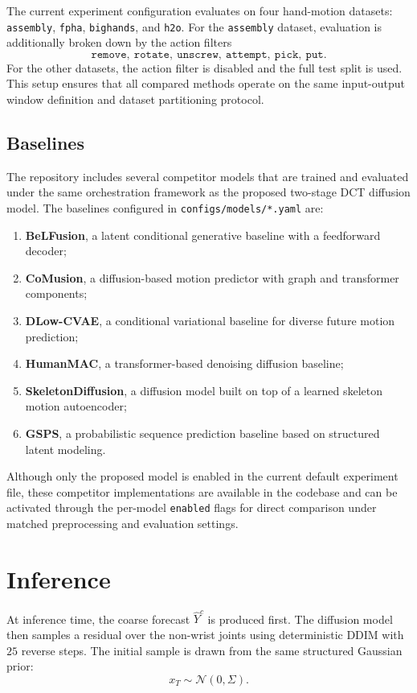 \documentclass[11pt]{article}
\begin{document}
The current experiment configuration evaluates on four hand-motion datasets:
\texttt{assembly}, \texttt{fpha}, \texttt{bighands}, and \texttt{h2o}. For
the \texttt{assembly} dataset, evaluation is additionally broken down by the
action filters
\[
\texttt{remove},\ \texttt{rotate},\ \texttt{unscrew},\ \texttt{attempt},\ \texttt{pick},\ \texttt{put}.
\]
For the other datasets, the action filter is disabled and the full test split
is used. This setup ensures that all compared methods operate on the same
input-output window definition and dataset partitioning protocol.

\subsection{Baselines}

The repository includes several competitor models that are trained and
evaluated under the same orchestration framework as the proposed two-stage DCT
diffusion model. The baselines configured in
\texttt{configs/models/*.yaml} are:
\begin{enumerate}
\item \textbf{BeLFusion}, a latent conditional generative baseline with a
feedforward decoder;
\item \textbf{CoMusion}, a diffusion-based motion predictor with graph and
transformer components;
\item \textbf{DLow-CVAE}, a conditional variational baseline for diverse
future motion prediction;
\item \textbf{HumanMAC}, a transformer-based denoising diffusion baseline;
\item \textbf{SkeletonDiffusion}, a diffusion model built on top of a learned
skeleton motion autoencoder;
\item \textbf{GSPS}, a probabilistic sequence prediction baseline based on
structured latent modeling.
\end{enumerate}

Although only the proposed model is enabled in the current default experiment
file, these competitor implementations are available in the codebase and can
be activated through the per-model \texttt{enabled} flags for direct
comparison under matched preprocessing and evaluation settings.

\section{Inference}

At inference time, the coarse forecast $\hat{Y}^{c}$ is produced first. The diffusion model then samples a residual over the non-wrist joints using deterministic DDIM with $25$ reverse steps. The initial sample is drawn from the same structured Gaussian prior:
\[
x_T \sim \mathcal{N}(0,\Sigma).
\]
\end{document}
